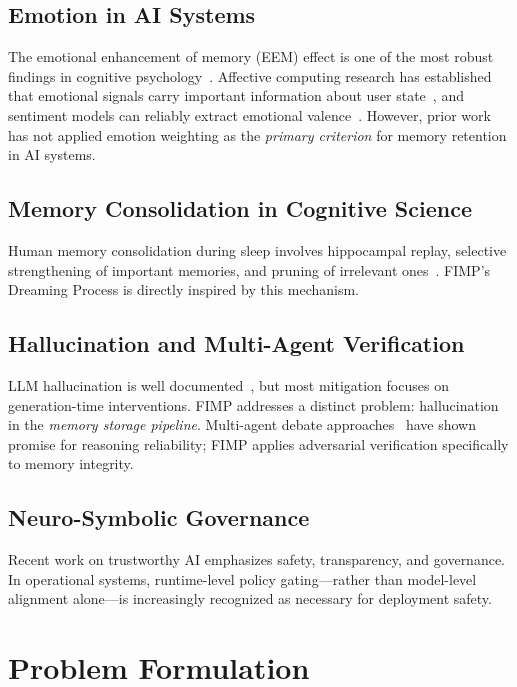 \documentclass[11pt,a4paper]{article}
\begin{document}
\subsection{Emotion in AI Systems}
The emotional enhancement of memory (EEM) effect is one of the most robust findings in
cognitive psychology~\citep{labar2006cognitive}. Affective computing research has established
that emotional signals carry important information about user
state~\citep{picard1997affective}, and sentiment models can reliably extract emotional
valence~\citep{devlin2019bert,liu2019roberta}. However, prior work has not applied emotion
weighting as the \emph{primary criterion} for memory retention in AI systems.

\subsection{Memory Consolidation in Cognitive Science}
Human memory consolidation during sleep involves hippocampal replay, selective strengthening
of important memories, and pruning of irrelevant
ones~\citep{walker2004sleep,diekelmann2010memory}. FIMP's Dreaming Process is directly
inspired by this mechanism.

\subsection{Hallucination and Multi-Agent Verification}
LLM hallucination is well documented~\citep{ji2023survey,huang2023survey}, but most
mitigation focuses on generation-time interventions. FIMP addresses a distinct problem:
hallucination in the \emph{memory storage pipeline}. Multi-agent debate
approaches~\citep{du2023multiagent,liang2023divergent} have shown promise for reasoning
reliability; FIMP applies adversarial verification specifically to memory integrity.

\subsection{Neuro-Symbolic Governance}
Recent work on trustworthy AI emphasizes safety, transparency, and governance. In operational
systems, runtime-level policy gating---rather than model-level alignment alone---is
increasingly recognized as necessary for deployment safety.

\section{Problem Formulation}
\end{document}
